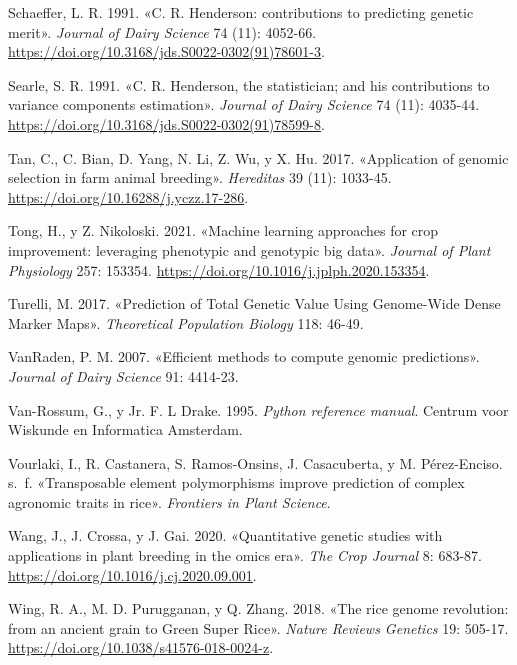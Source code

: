 \documentclass[11pt,spanish,a4paper,oneside,]{book} %
\begin{document}
\leavevmode\hypertarget{ref-cite:27}{}%
Schaeffer, L. R. 1991. «C. R. Henderson: contributions to predicting genetic merit». \emph{Journal of Dairy Science} 74 (11): 4052-66. \url{https://doi.org/10.3168/jds.S0022-0302(91)78601-3}.

\leavevmode\hypertarget{ref-cite:29}{}%
Searle, S. R. 1991. «C. R. Henderson, the statistician; and his contributions to variance components estimation». \emph{Journal of Dairy Science} 74 (11): 4035-44. \url{https://doi.org/10.3168/jds.S0022-0302(91)78599-8}.

\leavevmode\hypertarget{ref-cite:34}{}%
Tan, C., C. Bian, D. Yang, N. Li, Z. Wu, y X. Hu. 2017. «Application of genomic selection in farm animal breeding». \emph{Hereditas} 39 (11): 1033-45. \url{https://doi.org/10.16288/j.yczz.17-286}.

\leavevmode\hypertarget{ref-cite:7}{}%
Tong, H., y Z. Nikoloski. 2021. «Machine learning approaches for crop improvement: leveraging phenotypic and genotypic big data». \emph{Journal of Plant Physiology} 257: 153354. \url{https://doi.org/10.1016/j.jplph.2020.153354}.

\leavevmode\hypertarget{ref-cite:9}{}%
Turelli, M. 2017. «Prediction of Total Genetic Value Using Genome-Wide Dense Marker Maps». \emph{Theoretical Population Biology} 118: 46-49.

\leavevmode\hypertarget{ref-cite:39}{}%
VanRaden, P. M. 2007. «Efficient methods to compute genomic predictions». \emph{Journal of Dairy Science} 91: 4414-23.

\leavevmode\hypertarget{ref-cite:53}{}%
Van-Rossum, G., y Jr. F. L Drake. 1995. \emph{Python reference manual}. Centrum voor Wiskunde en Informatica Amsterdam.

\leavevmode\hypertarget{ref-cite:26}{}%
Vourlaki, I., R. Castanera, S. Ramos-Onsins, J. Casacuberta, y M. Pérez-Enciso. s.~f. «Transposable element polymorphisms improve prediction of complex agronomic traits in rice». \emph{Frontiers in Plant Science}.

\leavevmode\hypertarget{ref-cite:46}{}%
Wang, J., J. Crossa, y J. Gai. 2020. «Quantitative genetic studies with applications in plant breeding in the omics era». \emph{The Crop Journal} 8: 683-87. \url{https://doi.org/10.1016/j.cj.2020.09.001}.

\leavevmode\hypertarget{ref-cite:55}{}%
Wing, R. A., M. D. Purugganan, y Q. Zhang. 2018. «The rice genome revolution: from an ancient grain to Green Super Rice». \emph{Nature Reviews Genetics} 19: 505-17. \url{https://doi.org/10.1038/s41576-018-0024-z}.
\end{document}
